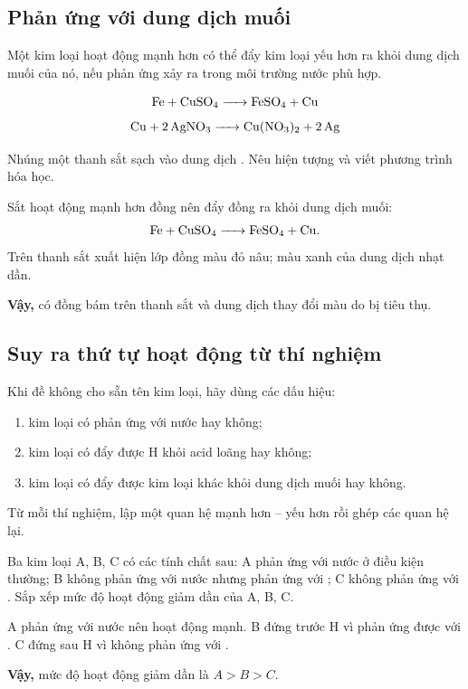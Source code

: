 \subsection{Phản ứng với dung dịch muối}

Một kim loại hoạt động mạnh hơn có thể đẩy kim loại yếu hơn ra khỏi dung dịch muối của nó, nếu phản ứng xảy ra trong môi trường nước phù hợp.

\[
\ce{Fe + CuSO4 -> FeSO4 + Cu}
\]
\[
\ce{Cu + 2AgNO3 -> Cu(NO3)2 + 2Ag}
\]

\begin{vidu}
Nhúng một thanh sắt sạch vào dung dịch . Nêu hiện tượng và viết phương trình hóa học.
\end{vidu}
\begin{loigiai}
Sắt hoạt động mạnh hơn đồng nên đẩy đồng ra khỏi dung dịch muối:
\[
\ce{Fe + CuSO4 -> FeSO4 + Cu}.
\]
Trên thanh sắt xuất hiện lớp đồng màu đỏ nâu; màu xanh của dung dịch  nhạt dần.

\textbf{Vậy,} có đồng bám trên thanh sắt và dung dịch thay đổi màu do  bị tiêu thụ.
\end{loigiai}

\subsection{Suy ra thứ tự hoạt động từ thí nghiệm}

Khi đề không cho sẵn tên kim loại, hãy dùng các dấu hiệu:
\begin{enumerate}
\item kim loại có phản ứng với nước hay không;
\item kim loại có đẩy được H khỏi acid loãng hay không;
\item kim loại có đẩy được kim loại khác khỏi dung dịch muối hay không.
\end{enumerate}
Từ mỗi thí nghiệm, lập một quan hệ mạnh hơn -- yếu hơn rồi ghép các quan hệ lại.

\begin{tuluyen}
Ba kim loại A, B, C có các tính chất sau: A phản ứng với nước ở điều kiện thường; B không phản ứng với nước nhưng phản ứng với ; C không phản ứng với . Sắp xếp mức độ hoạt động giảm dần của A, B, C.
\begin{loigiaiBT}
A phản ứng với nước nên hoạt động mạnh. B đứng trước H vì phản ứng được với . C đứng sau H vì không phản ứng với .

\textbf{Vậy,} mức độ hoạt động giảm dần là $A>B>C$.
\end{loigiaiBT}
\end{tuluyen}

